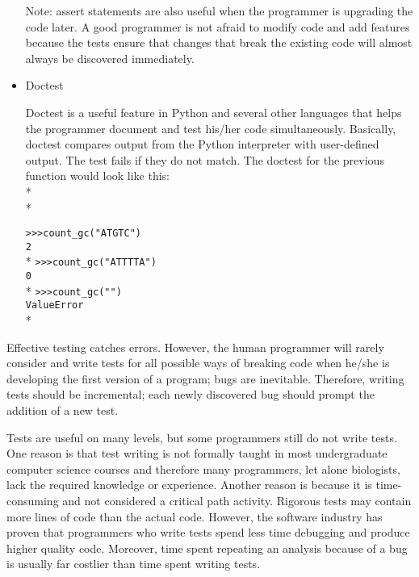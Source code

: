 \documentclass[ChapterTOCs,krantz2]{krantz} %
\begin{document}
\begin{itemize}
Note: assert
statements are also useful 
when the programmer is upgrading the code later.
A good programmer is not afraid to modify code and add features because the
tests ensure that changes that break the existing code will almost always
be discovered immediately.

\item Doctest

Doctest is a useful feature in Python and several other languages that helps the 
programmer document
and test his/her code simultaneously. Basically, doctest compares output
from the Python interpreter with user-defined output. The test fails if they do
not match. The doctest for the previous function would look like this:\\*\\*

\texttt{>>>count\_gc("ATGTC") \\2}\\*
\texttt{>>>count\_gc("ATTTTA") \\0}\\*
\texttt{>>>count\_gc("")\\ValueError}\\*

\end{itemize}

Effective testing catches errors. However, the human programmer will
rarely consider and write tests for all possible ways of breaking code when
he/she is developing the first version of a program; bugs are inevitable.
Therefore, writing tests should be incremental; each newly discovered bug
should prompt the addition of a new test.

Tests are useful on many levels, but some programmers still do not
write tests\cite{Wilson2006}.  One reason is that test writing is not formally taught in most
undergraduate computer science courses and therefore many programmers, let
alone biologists, lack the required knowledge or experience.  Another reason is
because it is time-consuming and not considered a critical path activity\cite{Segal2007,Kelly2008}.
Rigorous tests may contain more lines of code than the actual code. 
However, the software industry has proven that 
programmers who write tests 
spend less time debugging and produce higher quality code.
Moreover, time spent repeating an analysis because of a bug is usually far
costlier than time spent writing tests.
\end{document}
